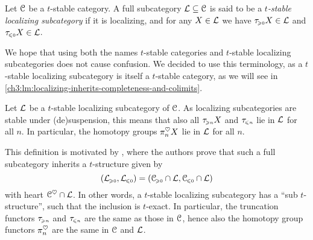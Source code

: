 \begin{definition}
    \label{ch3:def:t-stable-localizing-subcategory}
    Let $\EuScript{C}$ be a $t$-stable category. A full subcategory $\mathcal{L}\subseteq \EuScript{C}$ is said to be a \emph{$t$-stable localizing subcategory} if it is localizing, and for any $X\in \mathcal{L}$ we have $\tau_{\hspace{-1pt}\scriptscriptstyle\geqslant 0} X\in \mathcal{L}$ and $\tau_{\hspace{-1pt}\scriptscriptstyle\leqslant 0} X\in \mathcal{L}$. 
\end{definition}

\begin{remark}
    We hope that using both the names $t$-stable categories and $t$-stable localizing subcategories does not cause confusion. We decided to use this terminology, as a $t$-stable localizing subcategory is itself a $t$-stable category, as we will see in \cref{ch3:lm:localizing-inherits-completeness-and-colimits}. 
\end{remark}

\begin{remark}
    Let $\mathcal{L}$ be a $t$-stable localizing subcategory of $\EuScript{C}$. As localizing subcategories are stable under (de)suspension, this means that also all $\tau_{\hspace{-1pt}\scriptscriptstyle\geqslant n} X$ and $\tau_{\hspace{-1pt}\scriptscriptstyle\leqslant n}$ lie in $\mathcal{L}$ for all $n$. In particular, the homotopy groups $\pi_n^\heartsuit X$ lie in $\mathcal{L}$ for all $n$. 
\end{remark}

\begin{remark}
    \label{ch3:rm:t-stable-truncation-homotopy-the-same-functors}
    This definition is motivated by \cite[1.3.19]{beilinson-bernstein-deligne_1983}, where the authors prove that such a full subcategory inherits a $t$-structure given by 
    \[(\mathcal{L}_{\hspace{-1pt}\scriptscriptstyle\geqslant 0}, \mathcal{L}_{\hspace{-1pt}\scriptscriptstyle\leqslant 0}) = (\EuScript{C}_{\hspace{-1pt}\scriptscriptstyle\geqslant 0}\cap \mathcal{L}, \EuScript{C}_{\hspace{-1pt}\scriptscriptstyle\leqslant 0}\cap \mathcal{L})\]
    with heart $\EuScript{C}^\heartsuit\cap \mathcal{L}$. In other words, a $t$-stable localizing subcategory has a ``sub $t$-structure'', such that the inclusion is $t$-exact. In particular, the truncation functors $\tau_{\hspace{-1pt}\scriptscriptstyle\geqslant n}$ and $\tau_{\hspace{-1pt}\scriptscriptstyle\leqslant n}$ are the same as those in $\EuScript{C}$, hence also the homotopy group functors $\pi_n^\heartsuit$ are the same in $\EuScript{C}$ and $\mathcal{L}$. 
\end{remark}



